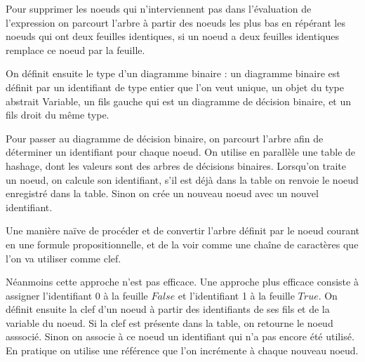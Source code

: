 \documentclass[11pt]{article}
\begin{document}
Pour supprimer les noeuds qui n'interviennent pas dans l'évaluation de l'expression on parcourt l'arbre à partir des noeuds les plus bas en répérant les noeuds qui ont deux feuilles identiques, si un noeud a deux feuilles identiques remplace ce noeud par la feuille.

On définit ensuite le type d'un diagramme binaire : un diagramme binaire est définit par un identifiant de type entier que l'on veut unique, un objet du type abstrait Variable, un fils gauche qui est un diagramme de décision binaire, et un fils droit du même type.  

Pour passer au diagramme de décision binaire, on parcourt l'arbre afin de déterminer un identifiant pour chaque noeud. On utilise en parallèle une table de hashage, dont les valeurs sont des arbres de décisions binaires. Lorsqu'on traite un noeud, on calcule son identifiant, s'il est déjà dans la table on renvoie le noeud enregistré dans la table. Sinon on crée un nouveau noeud avec un nouvel identifiant.

Une manière naïve de procéder et de convertir l'arbre définit par le noeud courant en une formule propositionnelle, et de la voir comme une chaîne de caractères que l'on va utiliser comme clef.

Néanmoins cette approche n'est pas efficace. Une approche plus efficace consiste à assigner l'identifiant $0$ à la feuille $False$ et l'identifiant 1 à la feuille $True$. On définit ensuite la clef d'un noeud à partir des identifiants de ses fils et de la variable du noeud. Si la clef est présente dans la table, on retourne le noeud asssocié. Sinon on associe à ce noeud un identifiant qui n'a pas encore été utilisé. En pratique on utilise une référence que l'on incrémente à chaque nouveau noeud. 
\end{document}
